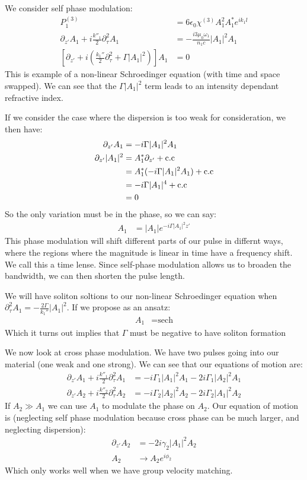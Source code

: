 We consider self phase modulation:
\begin{align*}
	P^{(3)}_1 &= 6\epsilon_0\chi^{(3)} A_1^2A_1^* e^{ik_1 l} \\
	\partial_{z'} A_1 + i\frac{k''_1}{2}\partial_\tau^2 A_1 &= -\frac{i3\mu_0\omega_1}{n_1 c}|A_1|^2 A_1 \\
	\left[\partial_{z'} + i\left(\frac{k_1''}{2}\partial_\tau^2 + \Gamma|A_1|^2\right)\right]A_1 &= 0
\end{align*}
This is example of a non-linear Schroedinger equation (with time and space swapped).
We can see that the $\Gamma |A_1|^2$ term leads to an intensity dependant refractive index.

If we consider the case where the dispersion is too weak for consideration, we then have:
\begin{align*}
	\partial_{z'}A_1 &= - i\Gamma|A_1|^2A_1 \\
	\partial_{z'} |A_1|^2 &= A_1^*\partial_{z'} + \text{c.c} \\
	&= A_1^*(-i\Gamma|A_1|^2A_1) + \text{c.c} \\
	&= -i\Gamma|A_1|^4 + \text{c.c} \\
	&= 0
\end{align*}
So the only variation must be in the phase, so we can say:
\begin{align*}
	A_1 &= |A_1| e^{-i\Gamma|A_1|^2 z'}
\end{align*}
This phase modulation will shift different parts of our pulse in differnt ways, where the regions where the magnitude is linear in time have a frequency shift. We call this a time lense.
Since self-phase modulation allows us to broaden the bandwidth, we can then shorten the pulse length.

We will have soliton soltions to our non-linear Schroedinger equation when $\partial_\tau^2 A_1 = -\frac{2\Gamma}{k_1''} |A_1|^2$. If we propose as an ansatz:
\begin{align*}
	A_1 &= \text{sech}
\end{align*}
Which it turns out implies that $\Gamma$ must be negative to have soliton formation

We now look at cross phase modulation. We have two pulses going into our material (one weak and one strong). We can see that our equations of motion are:
\begin{align*}
	\partial_{z'} A_1 + i\frac{k''_1}{2}\partial_\tau^2 A_1 &= -i\Gamma_1 |A_1|^2A_1 - 2i\Gamma_1|A_2|^2A_1 \\
	\partial_{z'} A_2 + i\frac{k''_2}{2}\partial_\tau^2 A_2 &= -i\Gamma_2 |A_2|^2A_2 - 2i\Gamma_2|A_1|^2A_2
\end{align*}
If $A_2\gg A_1$ we can use $A_1$ to modulate the phase on $A_2$. Our equation of motion is (neglecting self phase modulation because cross phase can be much larger, and neglecting dispersion):
\begin{align*}
	\partial_{z'} A_2 &= -2i\gamma_2|A_1|^2 A_2 \\
	A_2 &\to A_2 e^{i\phi_2}
\end{align*}
Which only works well when we have group velocity matching.
